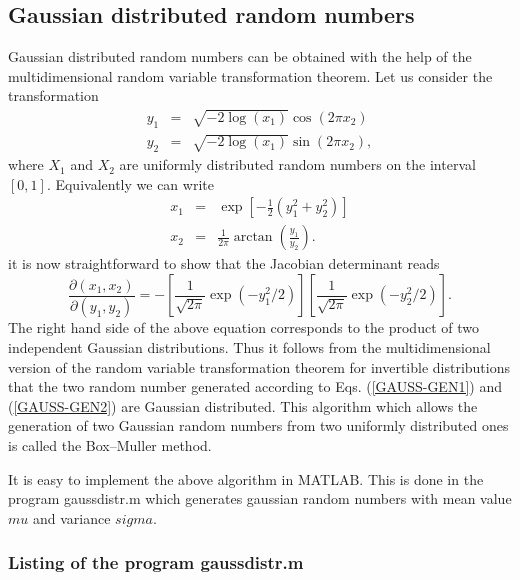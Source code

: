\subsection{Gaussian distributed random numbers}
Gaussian distributed random numbers can be obtained with the help 
of the multidimensional random variable transformation theorem.
Let us consider the transformation
\begin{eqnarray}
\label{GAUSS-GEN1}
y_1 & = & \sqrt{-2\log(x_1)} \cos(2 \pi x_2) \\
\label{GAUSS-GEN2}
y_2 & = & \sqrt{-2\log(x_1)} \sin(2 \pi x_2),
\end{eqnarray}
where $X_1$ and $X_2$ are uniformly distributed random numbers on 
the interval $[0,1]$. Equivalently we can write
\begin{eqnarray*}
x_1 & = & \exp[-\frac{1}{2}(y_1^2+y_2^2)] \\
x_2 & = & \frac{1}{2 \pi} \arctan\left( \frac{y_1}{y_2}\right).
\end{eqnarray*}
it is now straightforward  to show that the Jacobian determinant
reads
\begin{equation*}
\frac{\partial(x_1,x_2)}{\partial(y_1,y_2)} = 
   - \left[ \frac{1}{\sqrt{2 \pi}} \exp(-y_1^2/2)\right]
   \left[ \frac{1}{\sqrt{2 \pi}} \exp(-y_2^2/2)\right].
\end{equation*}
The right hand side of the above equation corresponds to the 
product of two independent Gaussian distributions. Thus it follows
from the multidimensional version of the random variable 
transformation  theorem for invertible distributions that the
two random number generated according to Eqs. (\ref{GAUSS-GEN1}) 
and (\ref{GAUSS-GEN2}) are Gaussian distributed. This algorithm 
which allows the generation of two Gaussian random numbers from 
two uniformly distributed ones is called the Box--Muller method.

It is easy to implement the above algorithm in 
MATLAB. This is done in the program {\sf gaussdistr.m} which generates
gaussian random numbers with mean value $mu$ and variance $sigma$.

\subsubsection{Listing of the program gaussdistr.m}

